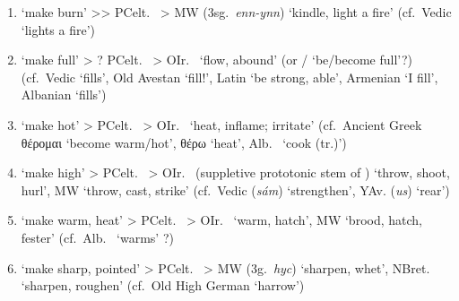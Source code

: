 \documentclass[output=paper,colorlinks,citecolor=brown]{langscibook}
\begin{document}
\begin{itemize}
\begin{enumerate}
    \item \label{ref:itemburn}  ‘make burn’ >{>} PCelt.\  > MW  (3sg.\ \textit{enn-ynn}) ‘kindle, light a fire’
        (cf.\ Vedic  ‘lights a fire’)
        
    \item \label{ref:itemfull}
     ‘make full’ > ? PCelt.\  > OIr.\   ‘flow, abound’ (or / ‘be/become full’?)
        (cf.\ Vedic  ‘fills’, Old Avestan  ‘fill!’, Latin  ‘be strong, able’, Armenian  ‘I fill’, Albanian  ‘fills’)
        
    \item {} ‘make hot’ > PCelt.\  > OIr.\   ‘heat, inflame; irritate’
        (cf.\ Ancient Greek {θέρομαι} ‘become warm/hot’, {θέρω}   ‘heat’, Alb.\  ‘cook (tr.)’)
        
    \item {} ‘make high’ > PCelt.\  > OIr.\   (suppletive prototonic stem of ) ‘throw, shoot, hurl’, MW  ‘throw, cast, strike’ 
        (cf.\ Vedic (\textit{sám})  ‘strengthen’, YAv. (\textit{us})  ‘rear’)
        
    \item {} ‘make warm, heat’ > PCelt.\  > OIr.\   ‘warm, hatch’, MW  ‘brood, hatch, fester’ 
        (cf.\ Alb.\  ‘warms’ ?)
        
    \item {} ‘make sharp, pointed’ > PCelt.\  > MW  (3g.\ \textit{hyc}) ‘sharpen, whet’, NBret.\   ‘sharpen, roughen’
        (cf.\ Old High German  ‘harrow’)
        

\end{enumerate}
\end{itemize}
\end{document}
